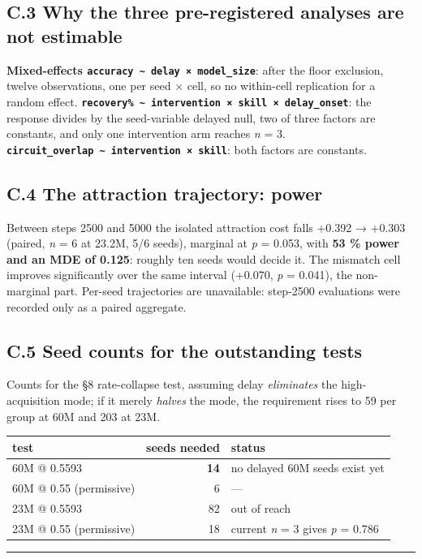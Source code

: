 \documentclass[11pt]{article}
\begin{document}
\subsection{C.3 Why the three pre-registered analyses are not estimable}\label{c.3-why-the-three-pre-registered-analyses-are-not-estimable}

\textbf{Mixed-effects \texttt{accuracy\ \textasciitilde{}\ delay\ ×\ model\_size}}: after the floor exclusion,
twelve observations, one per seed × cell, so no within-cell replication for a random
effect. \textbf{\texttt{recovery\%\ \textasciitilde{}\ intervention\ ×\ skill\ ×\ delay\_onset}}: the response divides
by the seed-variable delayed null, two of three factors are constants, and only one
intervention arm reaches \emph{n} = 3. \textbf{\texttt{circuit\_overlap\ \textasciitilde{}\ intervention\ ×\ skill}}:
both factors are constants.

\subsection{C.4 The attraction trajectory: power}\label{c.4-the-attraction-trajectory-power}

Between steps 2500 and 5000 the isolated attraction cost falls +0.392 → +0.303 (paired,
\emph{n} = 6 at 23.2M, 5/6 seeds), marginal at \emph{p} = 0.053, with \textbf{53 \% power and an MDE of 0.125}:
roughly ten seeds would decide it. The mismatch cell improves significantly over the same
interval (+0.070, \emph{p} = 0.041), the non-marginal part. Per-seed trajectories are unavailable:
step-2500 evaluations were recorded only as a paired aggregate.

\subsection{C.5 Seed counts for the outstanding tests}\label{c.5-seed-counts-for-the-outstanding-tests}

Counts for the §8 rate-collapse test, assuming delay \emph{eliminates} the high-acquisition mode;
if it merely \emph{halves} the mode, the requirement rises to 59 per group at 60M and 203 at 23M.

\begin{table}[h]
\centering\small
\begin{tabular}{@{}lrl@{}}
\toprule\noalign{}
test & seeds needed & status \\
\midrule\noalign{}

60M @ 0.5593 & \textbf{14} & no delayed 60M seeds exist yet \\
60M @ 0.55 (permissive) & 6 & --- \\
23M @ 0.5593 & 82 & out of reach \\
23M @ 0.55 (permissive) & 18 & current \emph{n} = 3 gives \emph{p} = 0.786 \\
\bottomrule
\end{tabular}
\end{table}


\begin{center}\rule{0.5\linewidth}{0.5pt}\end{center}
\end{document}
